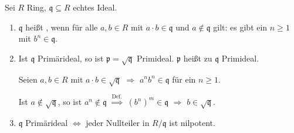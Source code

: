 \documentclass[a4paper, 10pt]{report}
\begin{document}
\begin{DefBem}
Sei $R$ Ring, $\mathfrak{q} \subseteq R$ echtes Ideal.

\begin{enumerate}
\item $\mathfrak{q}$ heißt , wenn für alle $a,b \in R$ mit $a \cdot b \in \mathfrak{q}$ und $a \notin \mathfrak{q}$ gilt: es gibt ein $n \geq 1$ mit $b^n \in \mathfrak{q}$.

\item Ist $\mathfrak{q}$ Primärideal, so ist $\mathfrak{p} = \sqrt{\mathfrak{q}}$ Primideal. $\mathfrak{p}$ heißt zu $\mathfrak{q}$  Primideal.

\begin{Bew}
Seien $a, b \in R$ mit $a \cdot b \in \sqrt{\mathfrak{q}}$ $\Rightarrow$ $a^n b^n \in \mathfrak{q}$ für ein $n \geq 1$.

Ist $a \notin \sqrt{\mathfrak{q}}$, so ist $a^n \notin \mathfrak{q}$
$\overset{\text{Def.}}{\Rightarrow}$ $(b^n)^m \in \mathfrak{q}$ $\Rightarrow$
$b \in \sqrt{\mathfrak{q}}$.
\end{Bew}

\item $\mathfrak{q}$ Primärideal $\Leftrightarrow$ jeder Nullteiler in $R / \mathfrak{q}$ ist nilpotent.

\end{enumerate}
\end{DefBem}
\end{document}
